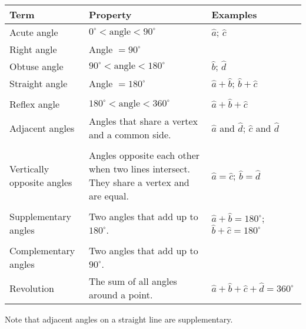 \begin{table}[H]
\begin{center}
\begin{tabular}{|p{3.5cm}|p{4cm}|p{4cm}|} \hline
\textbf{Term} & \textbf{Property} & \textbf{Examples}\\ \hline
Acute angle & $0^{\circ} < \mbox{angle} < 90^{\circ}$ & $\hat{a}$; $\hat{c}$ \\ \hline
Right angle & Angle $= 90^{\circ}$ &  \\ \hline
Obtuse angle & $90^{\circ} < \mbox{angle} < 180^{\circ}$ & $\hat{b}$; $\hat{d}$ \\ \hline
Straight angle & Angle $= 180^{\circ}$ & $\hat{a} + \hat{b}$;  $\hat{b} + \hat{c}$  \\
& &  \\ \hline
Reflex angle & $180^{\circ} < \mbox{angle} < 360^{\circ}$ & $\hat{a} + \hat{b} + \hat{c}$ \\ \hline
Adjacent angles & Angles that share a vertex and a common side. & $\hat{a}$ and $\hat{d}$;  $\hat{c}$ and $\hat{d}$ \\ 
& &  \\ \hline
Vertically opposite angles & Angles opposite each other when two lines intersect. They share a vertex and are equal. & $\hat{a}=\hat{c}$;  $\hat{b}=\hat{d}$\\
 &  & \\ \hline
Supplementary angles & Two angles that add up to $180^{\circ}$. & $\hat{a}+\hat{b}=180^{\circ}$; $\hat{b}+\hat{c}=180^{\circ}$ \\ 
& &  \\ \hline
Complementary angles & Two angles that add up to $90^{\circ}$. & \\ \hline
Revolution & The sum of all angles around a point. &  $\hat{a}+\hat{b}+\hat{c}+\hat{d}=360^{\circ}$ \\ \hline

\end{tabular}
\end{center}
\end{table}
\par

Note that adjacent angles on a straight line are supplementary.

